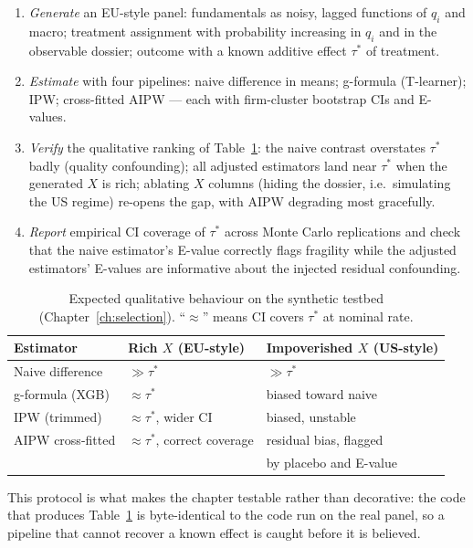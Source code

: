 \begin{enumerate}
\item \emph{Generate} an EU-style panel: fundamentals as noisy, lagged functions of
$q_i$ and macro; treatment assignment with probability increasing in $q_i$ and in the
observable dossier; outcome with a known additive effect $\tau^* $ of treatment.
\item \emph{Estimate} with four pipelines: naive difference in means; g-formula
(T-learner); IPW; cross-fitted AIPW --- each with firm-cluster bootstrap CIs and
E-values.
\item \emph{Verify} the qualitative ranking of Table~\ref{tab:causal-synth}: the naive
contrast overstates $\tau^*$ badly (quality confounding); all adjusted estimators land
near $\tau^*$ when the generated $X$ is rich; ablating $X$ columns (hiding the dossier,
i.e.\ simulating the US regime) re-opens the gap, with AIPW degrading most gracefully.
\item \emph{Report} empirical CI coverage of $\tau^*$ across Monte Carlo replications
and check that the naive estimator's E-value correctly flags fragility while the
adjusted estimators' E-values are informative about the injected residual confounding.
\end{enumerate}

\begin{table}[htbp]
\centering
\caption{Expected qualitative behaviour on the synthetic testbed
(Chapter~\ref{ch:selection}). ``$\approx$'' means CI covers $\tau^*$ at nominal rate.}
\label{tab:causal-synth}
\small
\begin{tabular}{@{}lll@{}}
\toprule
Estimator & Rich $X$ (EU-style) & Impoverished $X$ (US-style) \\
\midrule
Naive difference & $\gg \tau^*$ & $\gg \tau^*$ \\
g-formula (XGB) & $\approx \tau^*$ & biased toward naive \\
IPW (trimmed) & $\approx \tau^*$, wider CI & biased, unstable \\
AIPW cross-fitted & $\approx \tau^*$, correct coverage & residual bias, flagged \\
 & & by placebo and E-value \\
\bottomrule
\end{tabular}
\end{table}

This protocol is what makes the chapter testable rather than decorative: the code that
produces Table~\ref{tab:causal-synth} is byte-identical to the code run on the real
panel, so a pipeline that cannot recover a known effect is caught before it is believed.

